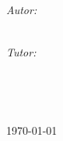 \documentclass[
11pt, %
oneside, %
spanish, %
singlespacing, %
headsepline, %
]{MastersDoctoralThesis} %
\author{\href{https://www.linkedin.com/in/alex02}{Alejandro Rodríguez López}}
\begin{document}
\frontmatter %

\pagestyle{plain} %


\begin{titlepage}
\begin{center}

\vspace*{.06\textheight}
{\scshape\LARGE \univname\\\facname\par}\vspace{1.5cm} %
\textsc{\Large \subjectname}\\[0.5cm] %

\HRule \\[0.4cm] %
{\huge \bfseries \ttitle\par}\vspace{0.4cm} %
\HRule \\[1.5cm] %
 
\begin{minipage}[t]{\textwidth}
	\begin{flushleft} \large
		\emph{Autor:}\\
		\authorname\\
    \vspace{2em}
	\end{flushleft}
\end{minipage}
\begin{minipage}[t]{0.8\textwidth}
	\begin{flushright} \large
		\emph{Tutor:} \\
		\tutorName
	\end{flushright}
\end{minipage}\\

\vfill
 
\large\textit{\requirements}\\[0.3cm] 
 
\vspace{5mm}

{\large \today}\\[4cm] %
 
\end{center}
\end{titlepage}
\end{document}

